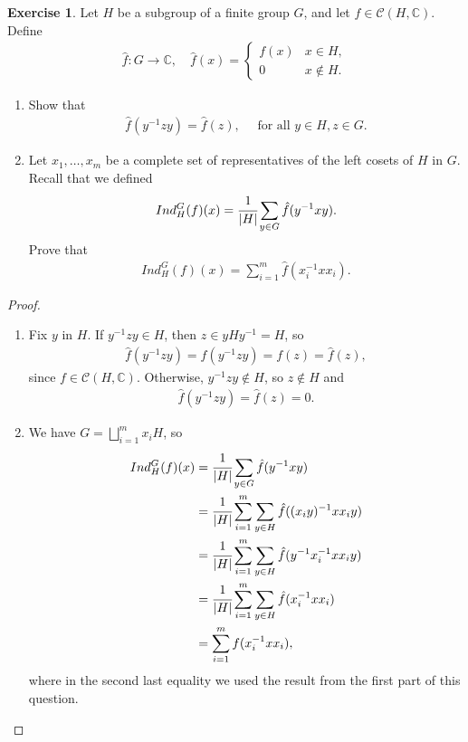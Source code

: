 \documentclass[8pt]{extarticle}
\newcommand{\abs}[1]{|#1|}
\newcommand{\C}{\mathbb{C}}
\newcommand{\<}{\langle}
\renewcommand{\>}{\rangle}
\theoremstyle{definition}
\newtheorem{exercise}{Exercise}
\begin{document}
\begin{exercise}
  Let $H$ be a subgroup of a finite group $G$, and let $f \in \mathcal{C}(H,\C)$. Define
  \begin{align*}
    \hat f : G \to \C, \quad \hat f (x) = 
    \begin{cases}
      f(x) & x \in H, \\
      0 & x \not \in H. 
    \end{cases}
  \end{align*}
  \begin{enumerate}
  \item
    Show that
    \begin{align*}
      \hat f (y^{-1} z y) = \hat f (z), \quad \text{ for all } y \in H, z \in G. 
    \end{align*}
  \item
    Let $x_1, \dots, x_m$ be a complete set of representatives of the left cosets of $H$ in $G$. Recall that we defined
    \begin{align*}
      Ind_H^G(f)(x) = \cfrac{1}{\abs{H}} \sum\limits_{y \in G} \hat f (y^{-1}xy).
    \end{align*}
    Prove that
    \begin{align*}
      Ind_H^G(f)(x) = \sum\limits_{i=1}^m \hat f (x_i^{-1}xx_i).      
    \end{align*}
  \end{enumerate}
\end{exercise}
\begin{proof}
  \begin{enumerate}
  \item
    Fix $y$ in $H$. If $y^{-1}zy \in H$, then $ z \in yHy^{-1}=H$, so
    \begin{align*}
      \hat f(y^{-1}zy) = f(y^{-1}zy) = f(z) = \hat f (z),
    \end{align*}
    since $f \in \mathcal{C}(H,\C)$. Otherwise, $y^{-1}zy \not \in H$, so $z \not \in H$ and
    \begin{align*}
      \hat f(y^{-1}zy) = \hat f(z) = 0.
    \end{align*}
  \item
    We have $G = \bigsqcup\limits_{i=1}^m x_iH$, so
    \begin{align*}
      Ind_H^G(f)(x)
      &=
      \cfrac{1}{\abs{H}} \sum\limits_{y \in G}\hat f (y^{-1}xy) \\
      &=
      \cfrac{1}{\abs{H}} \sum\limits_{i=1}^m \sum\limits_{y \in H}\hat f ((x_i y)^{-1}x x_i y) \\
      &= 
      \cfrac{1}{\abs{H}} \sum\limits_{i=1}^m \sum\limits_{y \in H}\hat f (y^{-1} x_i^{-1}x x_i y) \\
      &=
      \cfrac{1}{\abs{H}} \sum\limits_{i=1}^m \sum\limits_{y \in H}\hat f (x_i^{-1}x x_i) \\
      &=
      \sum\limits_{i=1}^m f (x_i^{-1}x x_i),                         
    \end{align*}
    where in the second last equality we used the result from the first part of this question.
  \end{enumerate}
\end{proof}
\end{document}
